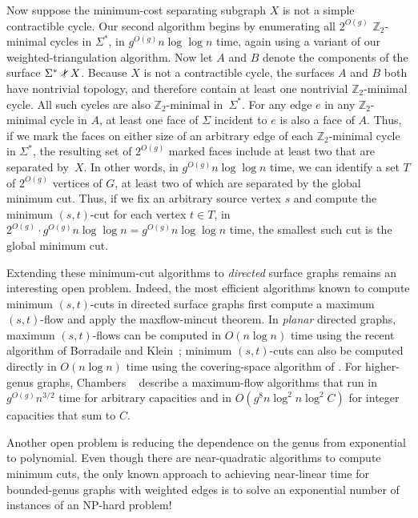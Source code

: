 \documentclass[natbib]{svcyclop}
\def\Z{\mathbb{Z}}
\def\snip{\mathbin{\raisebox{0.15ex}{\rotatebox[origin=c]{60}{\Rightscissors}\!}}}
\def\snip{\mathbin{\raisebox{0.15ex}{\rotatebox[origin=c]{60}{\Rightscissors}\!}}}
\begin{document}
Now suppose the minimum-cost separating subgraph $X$ is not a simple contractible cycle.  Our second algorithm begins by enumerating all $2^{O(g)}$ $\Z_2$-minimal cycles in $\Sigma^*$, in $g^{O(g)}n\log\log n$ time, again using a variant of our weighted-triangulation algorithm.  Now let $A$ and $B$ denote the components of the surface $\Sigma^*\snip X$.  Because $X$ is not a contractible cycle, the surfaces $A$ and $B$ both have nontrivial topology, and therefore contain at least one nontrivial $\Z_2$-minimal cycle.  All such cycles are also $\Z_2$-minimal in~$\Sigma^*$.  For any edge $e$ in any $\Z_2$-minimal cycle in $A$, at least one face of $\Sigma$ incident to $e$ is also a face of $A$.  Thus, if we mark the faces on either size of an arbitrary edge of each $\Z_2$-minimal cycle in $\Sigma^*$, the resulting set of $2^{O(g)}$ marked faces include at least two that are separated by~$X$.  In other words, in $g^{O(g)}n\log\log n$ time, we can identify a set $T$ of $2^{O(g)}$ vertices of $G$, at least two of which are separated by the global minimum cut.  Thus, if we fix an arbitrary source vertex $s$ and compute the minimum $(s,t)$-cut for each vertex $t\in T$, in $2^{O(g)}\cdot g^{O(g)}n\log\log n = g^{O(g)}n\log\log n$ time, the smallest such cut is the global minimum cut.




\OpenProb

Extending these minimum-cut algorithms to \emph{directed} surface graphs remains an interesting open problem.  Indeed, the most efficient algorithms known to compute minimum $(s,t)$-cuts in directed surface graphs first compute a maximum $(s,t)$-flow and apply the maxflow-mincut theorem.  In \emph{planar} directed graphs, maximum $(s,t)$-flows can be computed in $O(n\log n)$ time using the recent algorithm of Borradaile and Klein~\cite{bk-amfdp-09}; minimum $(s,t)$-cuts can also be computed directly in $O(n\log n)$ time using the covering-space algorithm of \cite{wobble}.
For higher-genus graphs, Chambers \etal~\cite{cen-hfcc-12} describe a  maximum-flow algorithms that run in $g^{O(g)}n^{3/2}$ time for arbitrary capacities and in $O(g^8 n\log^2 n \log^2 C)$ for integer capacities that sum to $C$.

Another open problem is reducing the dependence on the genus from exponential to polynomial.  Even though there are near-quadratic algorithms to compute minimum cuts, the only known approach to achieving near-linear time for bounded-genus graphs with weighted edges is to solve an exponential number of instances of an NP-hard problem!
\end{document}
